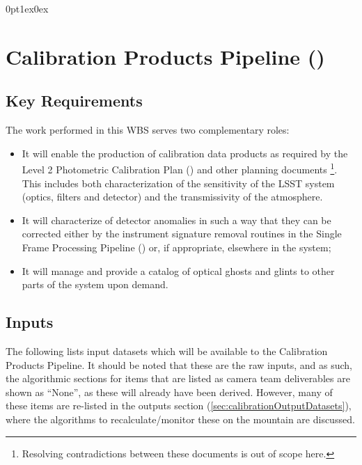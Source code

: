 \titlespacing*{\subsubsection}
{0pt}{1ex}{0ex}


\section{Calibration Products Pipeline (\wbsCPP)}

\subsection{Key Requirements}

The work performed in this WBS serves two complementary roles:

\begin{itemize}
  \item{It will enable the production of calibration data products as required by the Level 2 Photometric Calibration Plan (\NewPCP{}) and other planning documents \cite{Lupton15}\footnote{Resolving contradictions between these documents is out of scope here.}. This includes both characterization of the sensitivity of the LSST system (optics, filters and detector) and the transmissivity of the atmosphere.}
  \item{It will characterize of detector anomalies in such a way that they can be corrected either by the instrument signature removal routines in the Single Frame Processing Pipeline (\wbsSFM) or, if appropriate, elsewhere in the system;}
  \item{It will manage and provide a catalog of optical ghosts and glints to other parts of the system upon demand.}
\end{itemize}



\subsection{Inputs}

The following lists input datasets which will be available to the Calibration Products Pipeline. It should be noted that these are the raw inputs, and as such, the algorithmic sections for items that are listed as camera team deliverables are shown as ``None'', as these will already have been derived. However, many of these items are re-listed in the outputs section (\ref{sec:calibrationOutputDatasets}), where the algorithms to recalculate/monitor these on the mountain are discussed.


